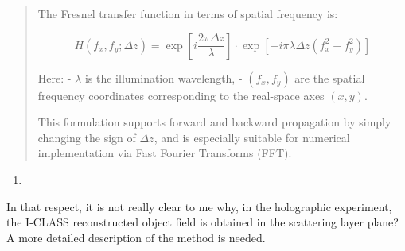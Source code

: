 \documentclass[12pt]{article}
\newenvironment{solved_reviewercomment}
    {\begin{tcolorbox}[width=\linewidth,colback=gray!5,colframe=solved_commentcolor!50,title=Reviewer Comment,left=5pt,right=5pt]}
    {\end{tcolorbox}}
\newenvironment{ourresponse}
    {\begin{tcolorbox}[width=\linewidth,breakable,enhanced,colback=gray!5,colframe=responsecolor!50,title=Response,left=5pt,right=5pt]}
    {\end{tcolorbox}}
\begin{document}
\begin{ourresponse}
\begin{quote}
        The Fresnel transfer function in terms of spatial frequency is:
        
        \begin{equation}
            H(f_x, f_y; \Delta z) = \exp\left[ i \frac{2\pi \Delta z}{\lambda} \right] \cdot \exp\left[ -i \pi \lambda \Delta z (f_x^2 + f_y^2) \right]
        \end{equation}
        
        Here:
        - $ \lambda $ is the illumination wavelength,
        - $ (f_x, f_y) $ are the spatial frequency coordinates corresponding to the real-space axes $ (x, y) $.
        
        This formulation supports forward and backward propagation by simply changing the sign of $ \Delta z $, and is especially suitable for numerical implementation via Fast Fourier Transforms (FFT).
        
    \end{quote}

            
\end{ourresponse}


    
\begin{enumerate}[label=\arabic*., resume]
\item \leavevmode
\end{enumerate}
\vspace{-1em}
\begin{solved_reviewercomment}
    In that respect, it is not really clear to me why, in the holographic experiment, the I-CLASS reconstructed object field is obtained in the scattering layer plane? A more detailed description of the method is needed.
\end{solved_reviewercomment}
\end{document}
